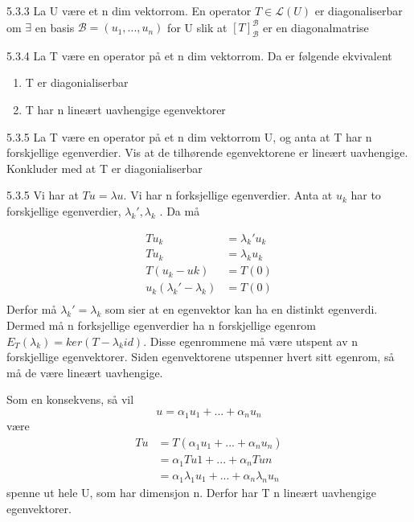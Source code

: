 \documentclass[a4paper,norsk]{article}
\begin{document}
\begin{definitionbox}{5.3.3}{}
    La U være et n dim vektorrom. En operator $ T \in \mathcal{L}(U) $ er diagonaliserbar om $ \exists $ en basis $ \mathcal{B} = \left( u_1, ..., u_n \right) $ for U slik at $ \left[ T \right] _{ \mathcal{B}}^{ \mathcal{B}} $ er en diagonalmatrise
\end{definitionbox}

\begin{propositionbox}{5.3.4}{}
La T være en operator på et n dim vektorrom. Da er følgende ekvivalent
\begin{enumerate}
    \item T er diagonialiserbar
    \item T har n lineært uavhengige egenvektorer
\end{enumerate}
\end{propositionbox}

\begin{oppgavebox}{5.3.5}{}
La T være en operator på et n dim vektorrom U, og anta at T har n forskjellige egenverdier. Vis at de tilhørende egenvektorene er lineært uavhengige. Konkluder med at T er diagonialiserbar

\begin{proofbox}{5.3.5}{}
Vi har at $ Tu = \lambda u $. Vi har n forksjellige egenverdier. Anta at $ u_k $ har to forskjellige egenverdier, $ \lambda _k', \lambda _k $ . Da må 

\begin{align*}
    Tu_k &= \lambda _k' u_k\\
    Tu_k &= \lambda _k u_k\\
    T \left( u_k - uk \right) &= T(0) \\
    u_k \left( \lambda _k' - \lambda _k \right) &= T(0)\\
\end{align*}
Derfor må $ \lambda _k' = \lambda _k $ som sier at en egenvektor kan ha en distinkt egenverdi. Dermed må n forksjellige egenverdier ha n forskjellige egenrom $ E_T ( \lambda _k) = ker \left( T - \lambda _k id \right)$. Disse egenrommene må være utspent av n forskjellige egenvektorer. Siden egenvektorene utspenner hvert sitt egenrom, så må de være lineært uavhengige. 

Som en konsekvens, så vil 
\[
    u = \alpha_{1}^{} u_1 + ... + \alpha_{n}^{} u_n
\]
være 
\begin{align*}
    Tu &= T \left( \alpha_{1}^{} u_1 + ... + \alpha_{n}^{} u_n \right) \\
    &= \alpha_{1}^{} Tu1 + ... + \alpha_{n}^{} Tun \\
    &= \alpha_{1}^{} \lambda_1 u_1 + ... + \alpha_{n}^{} \lambda _n u_n
\end{align*}
spenne ut hele U, som har dimensjon n. Derfor har T n lineært uavhengige egenvektorer.


\end{proofbox}
\end{oppgavebox}
\end{document}
